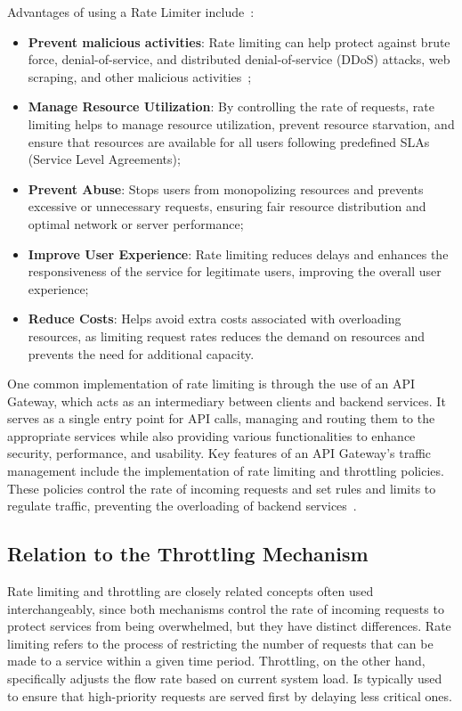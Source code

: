 Advantages of using a Rate Limiter include~\cite{solo-io-rate-limiting, kong-rate-limiting}:

\begin{itemize}
    \item \textbf{Prevent malicious activities}: Rate limiting can help protect against brute force, denial-of-service, and distributed denial-of-service (DDoS) attacks, web scraping, and other malicious activities~\cite{cloudflare-rate-limiting};
    \item \textbf{Manage Resource Utilization}: By controlling the rate of requests, rate limiting helps to manage resource utilization, prevent resource starvation, and ensure that resources are available for all users following predefined SLAs (Service Level Agreements);
    \item \textbf{Prevent Abuse}: Stops users from monopolizing resources and prevents excessive or unnecessary requests, ensuring fair resource distribution and optimal network or server performance;
    \item \textbf{Improve User Experience}: Rate limiting reduces delays and enhances the responsiveness of the service for legitimate users, improving the overall user experience;
    \item \textbf{Reduce Costs}: Helps avoid extra costs associated with overloading resources, as limiting request rates reduces the demand on resources and prevents the need for additional capacity.
\end{itemize}

One common implementation of rate limiting is through the use of an API Gateway,
which acts as an intermediary between clients and backend services.
It serves as a single entry point for API calls,
managing and routing them to the appropriate services while also providing various functionalities to enhance security,
performance, and usability.
Key features of an API Gateway's traffic management include the implementation of rate limiting and throttling policies.
These policies control the rate of incoming requests and set rules and limits to regulate traffic,
preventing the overloading of backend services~\cite{api-gateway}.

\subsection{Relation to the Throttling Mechanism}\label{subsec:rate-limiter-throttling}

Rate limiting and throttling are closely related concepts often used interchangeably,
since both mechanisms control the rate of incoming requests to protect services from being overwhelmed, but they have distinct differences.
Rate limiting refers to the process of restricting the number of requests that can be made to a service within a given time period.
Throttling, on the other hand,
specifically adjusts the flow rate based on current system load.
Is typically used to ensure that high-priority requests are served first by delaying less critical ones.

